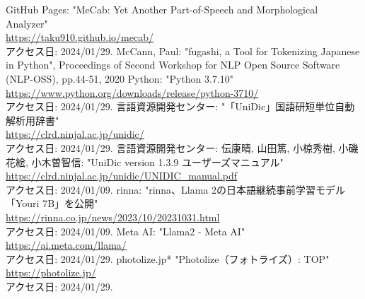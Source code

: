 \documentclass[uplatex, report, a4j, 10pt]{jsbook}
\begin{document}
\begin{thebibliography}{0}
  GitHub Pages: "MeCab: Yet Another Part-of-Speech and Morphological Analyzer"\\\url{https://taku910.github.io/mecab/}\\アクセス日: 2024/01/29.
  McCann, Paul: "fugashi, a Tool for Tokenizing Japanese in Python", Proceedings of Second Workshop for NLP Open Source Software (NLP-OSS), pp.44-51, 2020
  Python: "Python 3.7.10"\\\url{https://www.python.org/downloads/release/python-3710/}\\アクセス日: 2024/01/29.
  言語資源開発センター: "「UniDic」国語研短単位自動解析用辞書"\\\url{https://clrd.ninjal.ac.jp/unidic/}\\アクセス日: 2024/01/29.
  言語資源開発センター: 伝康晴, 山田篤, 小椋秀樹, 小磯花絵, 小木曽智信: "UniDic version 1.3.9 ユーザーズマニュアル"\\\url{https://clrd.ninjal.ac.jp/unidic/UNIDIC_manual.pdf}\\アクセス日: 2024/01/09.
  rinna: "rinna、Llama 2の日本語継続事前学習モデル「Youri 7B」を公開"\\\url{https://rinna.co.jp/news/2023/10/20231031.html}\\アクセス日: 2024/01/09.
  Meta AI: "Llama2 - Meta AI"\\\url{https://ai.meta.com/llama/}\\アクセス日: 2024/01/29.
  photolize.jp* "Photolize（フォトライズ）: TOP"\\\url{https://photolize.jp/}\\アクセス日: 2024/01/29.
\end{thebibliography}

\end{document}
